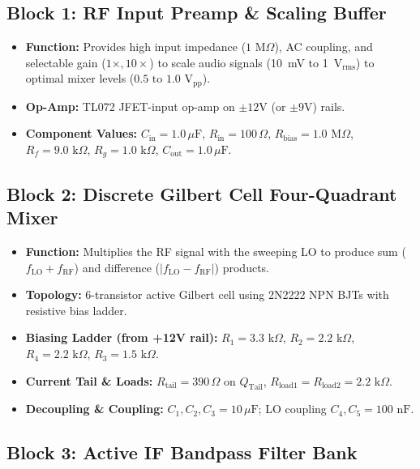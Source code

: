 \documentclass[11pt,a4paper]{article}
\begin{document}
\subsection{Block 1: RF Input Preamp \& Scaling Buffer}
\begin{itemize}[leftmargin=*]
    \item \textbf{Function:} Provides high input impedance ($1\text{ M}\Omega$), AC coupling, and selectable gain ($1\times, 10\times$) to scale audio signals (10~mV to 1~V$_{\text{rms}}$) to optimal mixer levels ($0.5\text{ to } 1.0\text{ V}_{\text{pp}}$).
    \item \textbf{Op-Amp:} TL072 JFET-input op-amp on $\pm 12\text{V}$ (or $\pm 9\text{V}$) rails.
    \item \textbf{Component Values:} $C_{\text{in}} = 1.0\,\mu\text{F}$, $R_{\text{in}} = 100\,\Omega$, $R_{\text{bias}} = 1.0\text{ M}\Omega$, $R_f = 9.0\text{ k}\Omega$, $R_g = 1.0\text{ k}\Omega$, $C_{\text{out}} = 1.0\,\mu\text{F}$.
\end{itemize}

\subsection{Block 2: Discrete Gilbert Cell Four-Quadrant Mixer}
\begin{itemize}[leftmargin=*]
    \item \textbf{Function:} Multiplies the RF signal with the sweeping LO to produce sum ($f_{\text{LO}} + f_{\text{RF}}$) and difference ($|f_{\text{LO}} - f_{\text{RF}}|$) products.
    \item \textbf{Topology:} 6-transistor active Gilbert cell using 2N2222 NPN BJTs with resistive bias ladder.
    \item \textbf{Biasing Ladder (from +12V rail):} $R_1 = 3.3\text{ k}\Omega$, $R_2 = 2.2\text{ k}\Omega$, $R_4 = 2.2\text{ k}\Omega$, $R_3 = 1.5\text{ k}\Omega$.
    \item \textbf{Current Tail \& Loads:} $R_{\text{tail}} = 390\,\Omega$ on $Q_{\text{Tail}}$, $R_{\text{load1}} = R_{\text{load2}} = 2.2\text{ k}\Omega$.
    \item \textbf{Decoupling \& Coupling:} $C_1, C_2, C_3 = 10\,\mu\text{F}$; LO coupling $C_4, C_5 = 100\text{ nF}$.
\end{itemize}

\subsection{Block 3: Active IF Bandpass Filter Bank}
\end{document}
